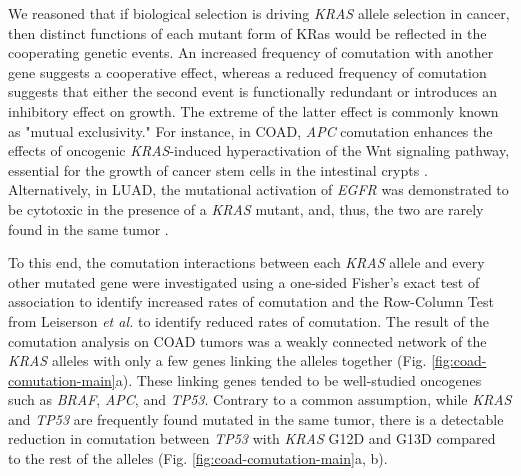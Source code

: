 \documentclass[english, 10pt, letterpaper]{article}
\newcommand{\KRAS}{\emph{KRAS}}
\newcommand{\kras}{KRas}
\begin{document}
We reasoned that if biological selection is driving \KRAS{} allele selection in cancer, then distinct functions of each mutant form of \kras{} would be reflected in the cooperating genetic events. 
An increased frequency of comutation with another gene suggests a cooperative effect, whereas a reduced frequency of comutation suggests that either the second event is functionally redundant or introduces an inhibitory effect on growth.
The extreme of the latter effect is commonly known as "mutual exclusivity."
For instance, in COAD, \emph{APC} comutation enhances the effects of oncogenic \KRAS{}-induced hyperactivation of the Wnt signaling pathway, essential for the growth of cancer stem cells in the intestinal crypts \cite{Janssen2006, Fearon2014, Sakai2018, Jauhri2017}.
Alternatively, in LUAD, the mutational activation of \emph{EGFR} was demonstrated to be cytotoxic in the presence of a \KRAS{} mutant, and, thus, the two are rarely found in the same tumor \cite{Unni2015EvidenceAdenocarcinoma., Ambrogio2017InAdenocarcinoma.}.

To this end, the comutation interactions between each \KRAS{} allele and every other mutated gene were investigated using a one-sided Fisher's exact test of association to identify increased rates of comutation and the Row-Column Test from Leiserson \emph{et al.} \cite{Leiserson2016} to identify reduced rates of comutation.
The result of the comutation analysis on COAD tumors was a weakly connected network of the \KRAS{} alleles with only a few genes linking the alleles together (Fig. \ref{fig:coad-comutation-main}a).
These linking genes tended to be well-studied oncogenes such as \emph{BRAF}, \emph{APC}, and \emph{TP53}.
Contrary to a common assumption, while \KRAS{} and \emph{TP53} are frequently found mutated in the same tumor, there is a detectable reduction in comutation between \emph{TP53} with \KRAS{} G12D and G13D compared to the rest of the alleles (Fig. \ref{fig:coad-comutation-main}a, b).
\end{document}
